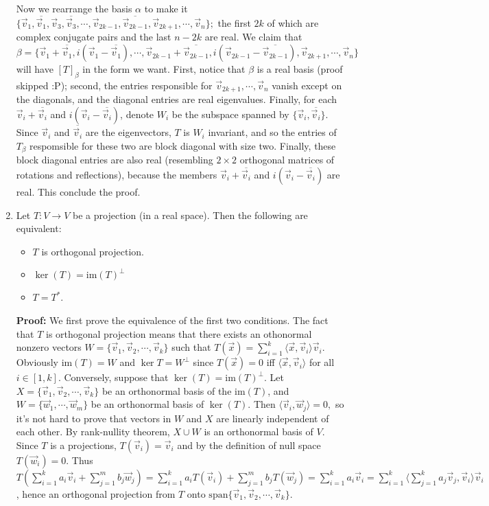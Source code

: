 \documentclass[11pt]{article}
\newcommand{\Span}{\mathrm{span}}
\newcommand{\ol}{\overline}
\newcommand{\inner}[2]{\langle #1, #2\rangle}
\begin{document}
\begin{enumerate}
Now we rearrange the basis $\alpha$ to make it 
$\{\vec{v}_1, \ol{\vec{v}_1}, \vec{v}_3, \ol{\vec{v}_3}, \cdots ,\vec{v}_{2k-1}, \ol{\vec{v}_{2k-1}}, \vec{v}_{2k+1}, \cdots , \vec{v}_n\};$ the first $2k$ of which are complex conjugate pairs and the last $n-2k$ are real. 
We claim that 
\[\beta=\{\vec{v}_1+\ol{\vec{v}_1},i(\vec{v}_1-\ol{\vec{v}_1}), \cdots ,\vec{v}_{2k-1}+ \ol{\vec{v}_{2k-1}}, i(\vec{v}_{2k-1}- \ol{\vec{v}_{2k-1}}), \vec{v}_{2k+1},\cdots , \vec{v}_n\}\]
will have $[T]_\beta$ in the form we want. 
First, notice that $\beta$ is a real basis (proof skipped :P); second, the entries responsible for $\vec{v}_{2k+1}, \cdots , \vec{v}_n$ vanish except on the diagonals, and the diagonal entries are real eigenvalues. 
Finally, for each $\vec{v}_i+\ol{\vec{v}_i}$ and $i(\vec{v}_i-\ol{\vec{v}_i})$, denote $W_i$ be the subspace spanned by 
$\{\vec{v}_i, \ol{\vec{v}_i}\}$. 
Since $\vec{v}_i$ and $\ol{\vec{v}_i}$ are the eigenvectors, $T$ is $W_i$ invariant, 
and so the entries of $T_\beta$ respomsible for these two are block diagonal with size two. 
Finally, these block diagonal entries are also real (resembling $2\times 2$ orthogonal matrices of rotations and reflections), 
because the members $\vec{v}_i+\ol{\vec{v}_i}$ and $i(\vec{v}_i-\ol{\vec{v}_i})$ are real. 
This conclude the proof. 

\item Let $T:V\to V$ be a projection (in a real space). Then the following are equivalent: 
\begin{itemize}
\item $T$ is orthogonal projection. 
\item $\ker (T)=\textrm{im} (T)^{\perp}$
\item $T=T^*$. 
\end{itemize}

\textbf{Proof:} 
We first prove the equivalence of the first two conditions. 
The fact that $T$ is orthogonal projection means that there exists an othonormal nonzero vectors 
$W=\{\vec{v}_1, \vec{v}_2, \cdots , \vec{v}_k\}$ such that 
$T(\vec{x})=\sum\limits_{i=1}^k \inner{\vec{x}}{\vec{v}_i}\vec{v}_i. $
Obviously $\textrm{im}(T)=W$ and $\ker{T}=W^{\perp}$ since 
$T(\vec{x})=0$ iff $\inner{\vec{x}}{\vec{v}_i}$ for all $i\in [1,k]$. 
Conversely, suppose that $\ker (T)=\textrm{im} (T)^{\perp}$. 
Let $X=\{\vec{v}_1, \vec{v}_2, \cdots , \vec{v}_k\}$ be an orthonormal basis of the $\textrm{im} (T)$, 
and $W=\{\vec{w}_1, \cdots , \vec{w}_m\}$ be an orthonormal basis of $\ker (T)$. 
Then $\inner {\vec{v}_i}{ \vec{w}_j}=0,$ so it's not hard to prove that vectors in $W$ and $X$ are linearly independent of each other. 
By rank-nullity theorem, $X\cup W$ is an orthonormal basis of $V$. 
Since $T$ is a projections, $T(\vec{v}_i)=\vec{v}_i$ and by the definition of null space $T(\vec{w}_i)=0$. 
Thus $T\left(\sum\limits_{i=1}^k a_i\vec{v}_i+\sum\limits_{j=1}^m b_j\vec{w}_j\right)
=\sum\limits_{i=1}^k a_iT\left(\vec{v}_i\right)+\sum\limits_{j=1}^m b_jT\left(\vec{w}_j\right)
=\sum\limits_{i=1}^k a_i\vec{v}_i
=\sum\limits_{i=1}^k\inner{\sum\limits_{j=1}^k a_j\vec{v}_j}{\vec{v}_i}\vec{v}_i
$
,
hence an orthogonal projection from $T$ onto $\Span\{\vec{v}_1, \vec{v}_2, \cdots , \vec{v}_k\}$. 


\end{enumerate}
\end{document}
